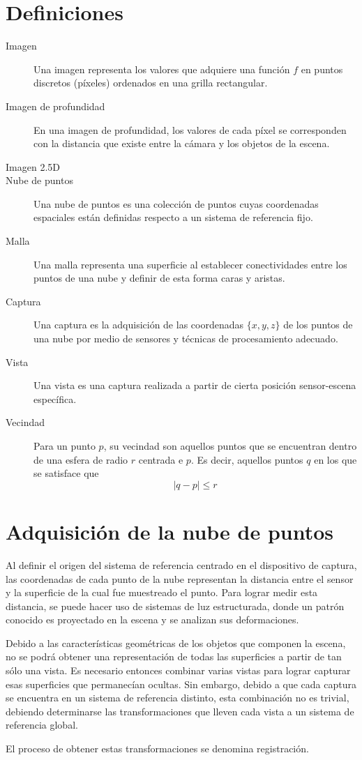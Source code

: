 \section{Definiciones}
\begin{description}
	\item [Imagen]
		Una imagen representa los valores que adquiere una función $f$
		en puntos discretos (píxeles) ordenados en una grilla rectangular.
	\item [Imagen de profundidad]
		En una imagen de profundidad, los valores de cada píxel se corresponden
		con la distancia que existe entre la cámara y los objetos de la escena.
	\item [Imagen 2.5D]
	\item [Nube de puntos]
		Una nube de puntos es una colección de puntos cuyas coordenadas espaciales
		están definidas respecto a un sistema de referencia fijo.
	\item [Malla]
		Una malla representa una superficie al establecer conectividades entre
		los puntos de una nube y definir de esta forma caras y aristas.
	\item [Captura]
		Una captura es la adquisición de las coordenadas $\{x, y, z\}$ de los puntos de una nube
		por medio de sensores y técnicas de procesamiento adecuado.
	\item [Vista]
		Una vista es una captura realizada a partir de cierta posición sensor-escena específica.
	\item [Vecindad]
		Para un punto $p$, su vecindad son aquellos puntos que se encuentran
		dentro de una esfera de radio $r$ centrada e $p$. Es decir, aquellos
		puntos $q$ en los que se satisface que
		\[ |q - p| \leq r \]
\end{description}

\section{Adquisición de la nube de puntos}
Al definir el origen del sistema de referencia centrado en el dispositivo de captura,
las coordenadas de cada punto de la nube representan la distancia entre el sensor y la superficie
de la cual fue muestreado el punto.
Para lograr medir esta distancia, se puede hacer uso de sistemas de luz estructurada,
donde un patrón conocido es proyectado en la escena y se analizan sus deformaciones.

Debido a las características geométricas de los objetos que componen la escena,
no se podrá obtener una representación de todas las superficies a partir de tan sólo
una vista. Es necesario entonces combinar varias vistas para lograr capturar
esas superficies que permanecían ocultas. Sin embargo, debido a que
cada captura se encuentra en un sistema de referencia distinto,
esta combinación no es trivial, debiendo determinarse las transformaciones que lleven
cada vista a un sistema de referencia global.

El proceso de obtener estas transformaciones se denomina registración.
